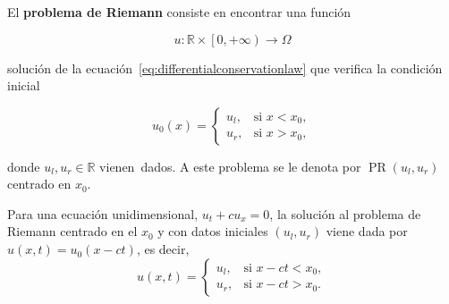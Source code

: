 \begin{frame}
    \frametitle{\secname}

    \begin{definition}
        El \textbf{problema de Riemann} consiste en encontrar una función

        \begin{equation*}
            u\colon\mathbb{R}\times
            \left[0,+\infty\right)\longrightarrow
            \Omega
        \end{equation*}

        solución de la ecuación~\eqref{eq:differentialconservationlaw} que
        verifica la condición inicial

        \begin{equation}\label{eq:initialconditionriemann}
            u_{0}\left(x\right)=
            \begin{cases}
                u_{l}, &
                \text{si } x<x_{0}, \\
                u_{r}, &
                \text{si } x>x_{0},
            \end{cases}
        \end{equation}

        donde $u_{l},u_{r}\in\mathbb{R}$ vienen~dados.
        A este problema se le denota por
        $\operatorname{PR}\left(u_{l},u_{r}\right)$ centrado en $x_{0}$.
    \end{definition}

    \begin{example}
        Para una ecuación unidimensional, $u_{t}+cu_{x}=0$, la solución al
        problema de Riemann centrado en el $x_{0}$ y con datos iniciales
        $\left(u_{l},u_{r}\right)$ viene dada por
        $u\left(x,t\right)=u_{0}\left(x-ct\right)$, es decir,
        \begin{equation}\label{eq:solutionriemann}
            u
            \left(x,t\right)=
            \begin{cases}
                u_{l}, &
                \text{si } x-ct<x_{0}, \\
                u_{r}, &
                \text{si } x-ct>x_{0}.
            \end{cases}
        \end{equation}
    \end{example}
\end{frame}